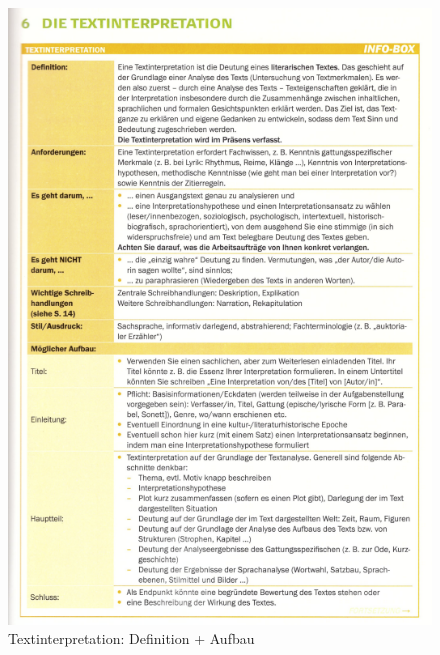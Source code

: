 \begin{figure}[h]
    \centering
    \includegraphics[scale=0.8]{./pics/Screenshot from 2023-02-06 12-31-18.png}
    \caption{Textinterpretation: Definition + Aufbau}
    \label{fig:impl:Textinterpretation1}
\end{figure}


